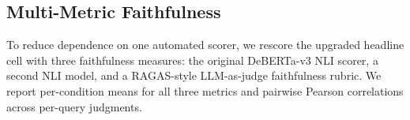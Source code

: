 
\subsection{Multi-Metric Faithfulness}
\label{sec:fix03_multimetric}

To reduce dependence on one automated scorer, we rescore the upgraded
headline cell with three faithfulness measures: the original DeBERTa-v3
NLI scorer, a second NLI model, and a RAGAS-style LLM-as-judge
faithfulness rubric. We report per-condition means for all three metrics
and pairwise Pearson correlations across per-query judgments.

